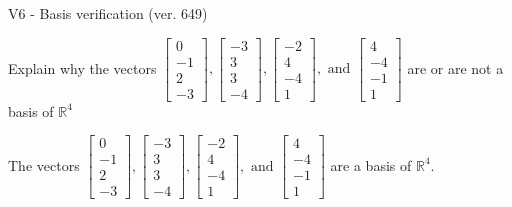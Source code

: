 \begin{exercise}
  \begin{exerciseTitle}V6 - Basis verification (ver. 649)\end{exerciseTitle}
  \begin{exerciseStatement}
    Explain why the vectors \(\left[\begin{array}{r}
0 \\
-1 \\
2 \\
-3
\end{array}\right] , \left[\begin{array}{r}
-3 \\
3 \\
3 \\
-4
\end{array}\right] , \left[\begin{array}{r}
-2 \\
4 \\
-4 \\
1
\end{array}\right] , \text{ and } \left[\begin{array}{r}
4 \\
-4 \\
-1 \\
1
\end{array}\right]\) are or are not a basis of \(\mathbb{R}^4\)	


  \end{exerciseStatement}
  \begin{exerciseAnswer}
   The vectors \(\left[\begin{array}{r}
0 \\
-1 \\
2 \\
-3
\end{array}\right] , \left[\begin{array}{r}
-3 \\
3 \\
3 \\
-4
\end{array}\right] , \left[\begin{array}{r}
-2 \\
4 \\
-4 \\
1
\end{array}\right] , \text{ and } \left[\begin{array}{r}
4 \\
-4 \\
-1 \\
1
\end{array}\right]\) 
  	 are  a basis of \(\mathbb{R}^4\).
  


  \end{exerciseAnswer}
\end{exercise}